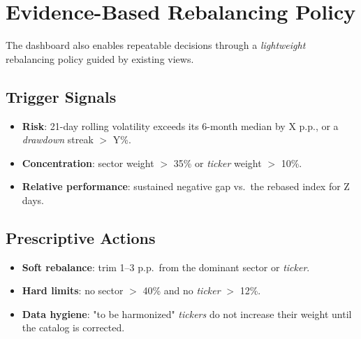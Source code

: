 \documentclass[conference]{IEEEtran}
\begin{document}
\section{Evidence-Based Rebalancing Policy}
The dashboard also enables repeatable decisions through a \emph{lightweight} rebalancing policy guided by existing views.

\subsection{Trigger Signals}
\begin{itemize}
    \item \textbf{Risk}: 21-day rolling volatility exceeds its 6-month median by X p.p., or a \emph{drawdown} streak $>$ Y\%.
    \item \textbf{Concentration}: sector weight $>$ 35\% or \emph{ticker} weight $>$ 10\%.
    \item \textbf{Relative performance}: sustained negative gap vs.\ the rebased index for Z days.
\end{itemize}

\subsection{Prescriptive Actions}
\begin{itemize}
    \item \textbf{Soft rebalance}: trim 1--3 p.p.\ from the dominant sector or \emph{ticker}.
    \item \textbf{Hard limits}: no sector $>$ 40\% and no \emph{ticker} $>$ 12\%.
    \item \textbf{Data hygiene}: "to be harmonized" \emph{tickers} do not increase their weight until the catalog is corrected.
\end{itemize}

\begin{table}[!t]
\centering
\caption{Rebalancing Policy Template (Parameterizable)}
\label{tab:policy}
\vspace{-2mm}
\end{table}
\end{document}
